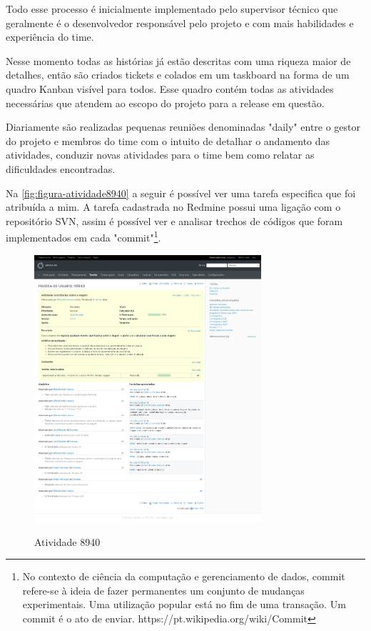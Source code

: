 Todo esse processo é inicialmente implementado pelo supervisor técnico que geralmente é o desenvolvedor responsável pelo projeto e com mais habilidades e experiência do time.

Nesse momento todas as histórias já estão descritas com uma riqueza maior de detalhes, então são criados tickets e colados em um taskboard na forma de um quadro Kanban visível para todos. Esse quadro contém todas as atividades necessárias que atendem ao escopo do projeto para a release em questão. 

Diariamente são realizadas pequenas reuniões denominadas "daily" entre o gestor do projeto e membros do time com o intuito de detalhar o andamento das atividades, conduzir novas atividades para o time bem como relatar as dificuldades encontradas.

Na \autoref{fig:figura-atividade8940} a seguir é possível ver uma tarefa especifica que foi atribuída a mim. A tarefa cadastrada no Redmine possui uma ligação com o repositório SVN, assim é possível ver e analisar trechos de códigos que foram implementados em cada "commit"\footnote{No contexto de ciência da computação e gerenciamento de dados, commit refere-se à ideia de fazer permanentes um conjunto de mudanças experimentais. Uma utilização popular está no fim de uma transação. Um commit é o ato de enviar. https://pt.wikipedia.org/wiki/Commit}.

\begin{figure}[!htb]
    \centering
    \caption{Atividade 8940}
    \includegraphics[width=0.75\textwidth]{dados/figuras/veiculos-atividade1.png}
    \label{fig:figura-atividade8940}
\end{figure}


